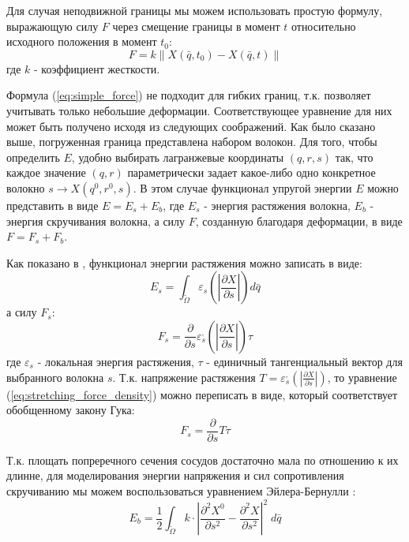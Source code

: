 Для случая неподвижной границы мы можем использовать простую формулу, выражающую силу $F$ через смещение границы
в момент $t$ относительно исходного положения в момент $t_0$:
\begin{equation}
    \label{eq:simple_force}
    F = k \| X(\bar{q}, t_0) - X(\bar{q}, t) \|
\end{equation}
где $k$ - коэффициент жесткости.

Формула (\ref{eq:simple_force}) не подходит для гибких границ, т.к. позволяет учитывать только небольшие деформации.
Соответствующее уравнение для них может быть получено исходя из следующих соображений.
Как было сказано выше, погруженная граница представлена набором волокон.
Для того, чтобы определить $E$, удобно выбирать лагранжевые координаты $(q, r, s)$ так,
что каждое значение $(q, r)$ параметрически задает какое-либо одно конкретное волокно $s \to X(q^0, r^0, s)$.
В этом случае функционал упругой энергии $E$ можно представить в виде $E = E_s + E_b$,
где $E_s$ - энергия растяжения волокна, $E_b$ - энергия скручивания волокна,
а силу $F$, созданную благодаря деформации, в виде $F = F_s + F_b$.

Как показано в \cite{peskin2002immersed}, \cite{griffith2009simulating} функционал энергии растяжения можно записать в виде:
\begin{equation}
\label{eq:stretching_energy_functional}
E_s = \int_{\tilde{\Omega}} \varepsilon_s \left(\left| \frac{\partial X}{\partial s} \right| \right) d\bar{q}
\end{equation}
а силу $F_s$:
\begin{equation}
\label{eq:stretching_force_density}
F_s = \frac{\partial}{\partial s} \varepsilon_s^{,} \left( \left| \frac{\partial X}{\partial s} \right| \right) \tau
\end{equation}
где $\varepsilon_s$ - локальная энергия растяжения, $\tau$ - единичный тангенциальный вектор для выбранного волокна $s$.
Т.к. напряжение растяжения $T = \varepsilon_s^{,} \left( \left| \frac{\partial X}{\partial s} \right| \right)$, то уравнение (\ref{eq:stretching_force_density})
можно переписать в виде, который соответствует обобщенному закону Гука:
\begin{equation}
\label{eq:stretching_force_density_simplified}
F_s = \frac{\partial}{\partial s} T \tau
\end{equation}

Т.к. площать попреречного сечения сосудов достаточно мала по отношению к их длинне, для моделирования энергии напряжения и 
сил сопротивления скручиванию мы можем воспользоваться уравнением Эйлера-Бернулли \cite{gere1997mechanics}:
\begin{equation}
    E_b = \frac{1}{2} \int_{\tilde{\Omega}} k \cdot \left| \frac{\partial^2 X^0}{\partial s^2} - \frac{\partial^2 X}{\partial s^2} \right|^2 \; d\bar{q}
\end{equation}

